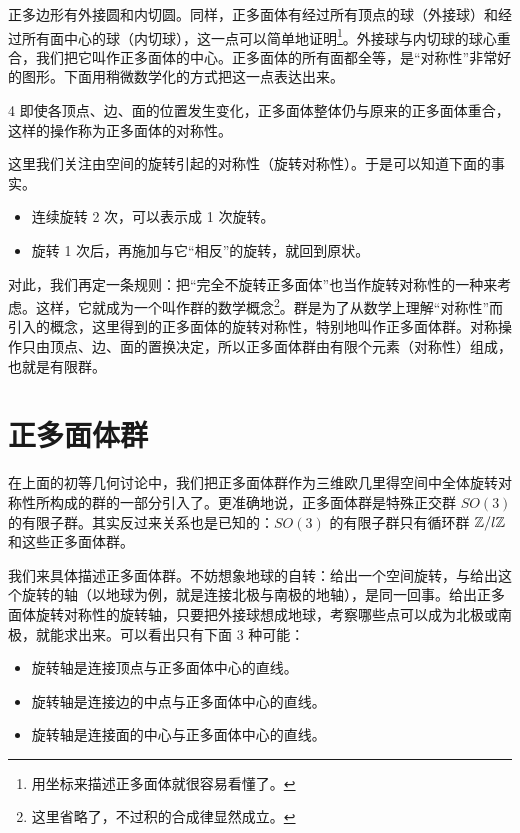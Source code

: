 正多边形有外接圆和内切圆。同样，正多面体有经过所有顶点的球（外接球）和经过所有面中心的球（内切球），这一点可以简单地证明\footnote{用坐标来描述正多面体就很容易看懂了。}。外接球与内切球的球心重合，我们把它叫作正多面体的中心。正多面体的所有面都全等，是“对称性”非常好的图形。下面用稍微数学化的方式把这一点表达出来。

\begin{definition}{4}
  即使各顶点、边、面的位置发生变化，正多面体整体仍与原来的正多面体重合，这样的操作称为正多面体的对称性。
\end{definition}

这里我们关注由空间的旋转引起的对称性（旋转对称性）。于是可以知道下面的事实。

\begin{itemize}
  \item 连续旋转 2 次，可以表示成 1 次旋转。
  \item 旋转 1 次后，再施加与它“相反”的旋转，就回到原状。
\end{itemize}

对此，我们再定一条规则：把“完全不旋转正多面体”也当作旋转对称性的一种来考虑。这样，它就成为一个叫作群的数学概念\footnote{这里省略了，不过积的合成律显然成立。}。群是为了从数学上理解“对称性”而引入的概念，这里得到的正多面体的旋转对称性，特别地叫作正多面体群。对称操作只由顶点、边、面的置换决定，所以正多面体群由有限个元素（对称性）组成，也就是有限群。

\section{正多面体群}

在上面的初等几何讨论中，我们把正多面体群作为三维欧几里得空间中全体旋转对称性所构成的群的一部分引入了。更准确地说，正多面体群是特殊正交群 $SO(3)$ 的有限子群。其实反过来关系也是已知的：$SO(3)$ 的有限子群只有循环群 $\mathbb{Z}/l\mathbb{Z}$ 和这些正多面体群。

我们来具体描述正多面体群。不妨想象地球的自转：给出一个空间旋转，与给出这个旋转的轴（以地球为例，就是连接北极与南极的地轴），是同一回事。给出正多面体旋转对称性的旋转轴，只要把外接球想成地球，考察哪些点可以成为北极或南极，就能求出来。可以看出只有下面 3 种可能：

\begin{itemize}
  \item 旋转轴是连接顶点与正多面体中心的直线。
  \item 旋转轴是连接边的中点与正多面体中心的直线。
  \item 旋转轴是连接面的中心与正多面体中心的直线。
\end{itemize}

